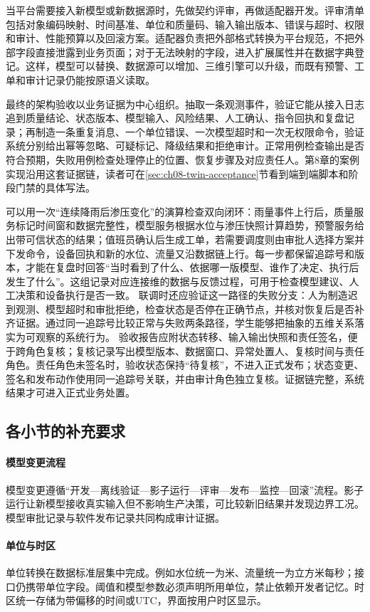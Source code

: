 当平台需要接入新模型或新数据源时，先做契约评审，再做适配器开发。评审清单包括对象编码映射、时间基准、单位和质量码、输入输出版本、错误与超时、权限和审计、性能预算以及回滚方案。适配器负责把外部格式转换为平台规范，不把外部字段直接泄露到业务页面；对于无法映射的字段，进入扩展属性并在数据字典登记。这样，模型可以替换、数据源可以增加、三维引擎可以升级，而既有预警、工单和审计记录仍能按原语义读取。

最终的架构验收以业务证据为中心组织。抽取一条观测事件，验证它能从接入日志追到质量结论、状态版本、模型输入、风险结果、人工确认、指令回执和复盘记录；再制造一条重复消息、一个单位错误、一次模型超时和一次无权限命令，验证系统分别给出幂等忽略、可疑标记、降级结果和拒绝审计。正常用例检查输出是否符合预期，失败用例检查处理停止的位置、恢复步骤及对应责任人。第8章的案例实现沿用这套证据链，读者可在\ref{sec:ch08-twin-acceptance}节看到端到端脚本和阶段门禁的具体写法。

可以用一次“连续降雨后渗压变化”的演算检查双向闭环：雨量事件上行后，质量服务标记时间窗和数据完整性，模型服务根据水位与渗压快照计算趋势，预警服务给出带可信状态的结果；值班员确认后生成工单，若需要调度则由审批人选择方案并下发命令，设备回执和新的水位、流量又沿数据链上行。每一步都保留追踪号和版本，才能在复盘时回答“当时看到了什么、依据哪一版模型、谁作了决定、执行后发生了什么”。这组记录对应连接维的数据与反馈过程，可用于检查模型建议、人工决策和设备执行是否一致。
联调时还应验证这一路径的失败分支：人为制造迟到观测、模型超时和审批拒绝，检查状态是否停在正确节点，并核对恢复后是否补齐证据。通过同一追踪号比较正常与失败两条路径，学生能够把抽象的五维关系落实为可观察的系统行为。
验收报告应附状态转移、输入输出快照和责任签名，便于跨角色复核；复核记录写出模型版本、数据窗口、异常处置人、复核时间与责任角色。责任角色未签名时，验收状态保持“待复核”，不进入正式发布；状态变更、签名和发布动作使用同一追踪号关联，并由审计角色独立复核。证据链完整，系统结果才可进入正式业务处置。

\subsection{各小节的补充要求}

\paragraph{模型变更流程}
模型变更遵循“开发—离线验证—影子运行—评审—发布—监控—回滚”流程。影子运行让新模型接收真实输入但不影响生产决策，可比较新旧结果并发现边界工况。模型审批记录与软件发布记录共同构成审计证据。

\paragraph{单位与时区}
单位转换在数据标准层集中完成。例如水位统一为米、流量统一为立方米每秒；接口仍携带单位字段。阈值和模型参数必须声明所用单位，禁止依赖开发者记忆。时区统一存储为带偏移的时间或UTC，界面按用户时区显示。

